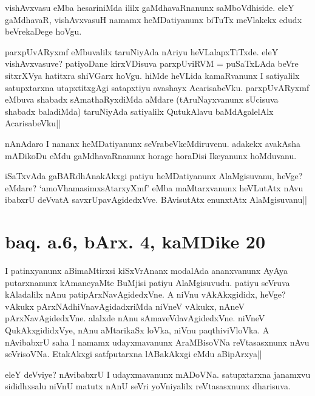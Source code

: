 
\begin{artha}
vishAvxvasu eMba hesariniMda ililx gaMdhavaRnanunx saMboVdhiside. eleY 
gaMdhavaR, vishAvxvasuH namamx heMDatiyanunx biTuTx meVlakekx edudx 
beVrekaDege hoVgu.
\end{artha}

\begin{artha}
parxpUvARyxmf eMbuvalilx taruNiyAda nAriyu heVLalapxTiTxde. eleY 
vishAvxvasuve? patiyoDane kirxVDisuva parxpUviRVM = puSaTxLAda beVre 
sitxrXVya hatitxra shiVGarx hoVgu. hiMde heVLida kamaRvanunx I 
satiyalilx satupxtarxna utapxtitxgAgi satapxtiyu avashayx 
AcarisabeVku. parxpUvARyxmf eMbuva shabadx sAmathaRyxdiMda aMdare 
(tAruNayxvanunx sUcisuva shabadx baladiMda) taruNiyAda satiyalilx 
QutukAlavu baMdAgalelAlx AcarisabeVku||
\end{artha}

\begin{artha}
nAnAdaro I nananx heMDatiyanunx seVrabeVkeMdiruvenu. adakekx avakAsha 
mADikoDu eMdu gaMdhavaRnanunx horage horaDisi Ikeyanunx hoMduvanu.
\end{artha}

\begin{artha}
iSaTxvAda gaBARdhAnakAkxgi patiyu heMDatiyanunx AlaMgisuvanu, heVge? 
eMdare? `amoVhamasimxsAtarxyXmf' eMba maMtarxvanunx heVLutAtx nAvu 
ibabxrU deVvatA savxrUpavAgidedxVve. BAvisutAtx enunxtAtx 
AlaMgisuvanu||
\end{artha}

\section*{baq. a.6, bArx. 4, kaMDike 20}

\stext

I patinxyanunx aBimaMtirxsi kiSxVrAnanx modalAda ananxvanunx AyAya 
putarxnanunx kAmaneyaMte BuMjisi patiyu AlaMgisuvudu. patiyu seVruva 
kAladalilx nAnu patipArxNavAgidedxVne. A niVnu vAkAkxgididx, heVge? 
vAkukx pArxNAdhiVnavAgidadxriMda niVneV vAkukx, nAneV 
pArxNavAgidedxVne. alalxde nAnu sAmaveVdavAgidedxVne. niVneV 
QukAkxgididxVye, nAnu aMtarikaSx loVka, niVnu paqthiviVloVka. A 
nAvibabxrU saha I namamx udayxmavanunx AraMBisoVNa reVtasasxnunx nAvu 
seVrisoVNa. EtakAkxgi satfputarxna lABakAkxgi eMdu aBipArxya||

\begin{artha}
eleY deVviye? nAvibabxrU I udayxmavanunx mADoVNa. satupxtarxna 
janamxvu sididhxsalu niVnU matutx nAnU seVri yoVniyalilx reVtasasxnunx 
dharisuva.
\end{artha}

